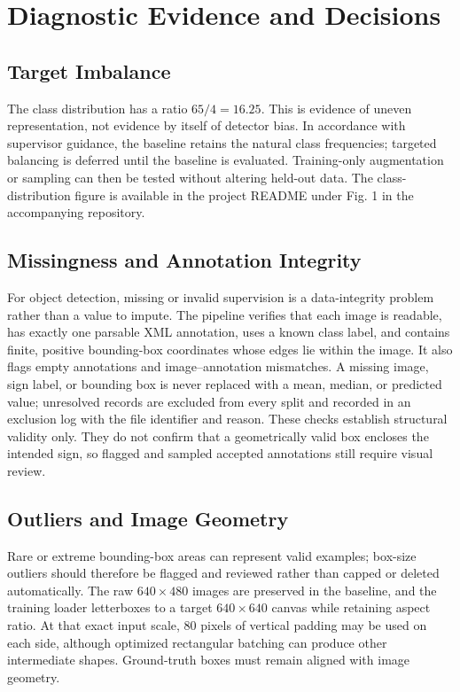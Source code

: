 \documentclass[conference]{IEEEtran}
\begin{document}
\section{Diagnostic Evidence and Decisions}
\subsection{Target Imbalance}
The class distribution has a ratio $65/4=16.25$. This is evidence of uneven representation, not evidence by itself of detector bias. In accordance with supervisor guidance, the baseline retains the natural class frequencies; targeted balancing is deferred until the baseline is evaluated. Training-only augmentation or sampling can then be tested without altering held-out data. The class-distribution figure is available in the project README under Fig. 1 in the accompanying repository.
\subsection{Missingness and Annotation Integrity}
For object detection, missing or invalid supervision is a data-integrity problem rather than a value to impute. The pipeline verifies that each image is readable, has exactly one parsable XML annotation, uses a known class label, and contains finite, positive bounding-box coordinates whose edges lie within the image. It also flags empty annotations and image--annotation mismatches. A missing image, sign label, or bounding box is never replaced with a mean, median, or predicted value; unresolved records are excluded from every split and recorded in an exclusion log with the file identifier and reason. These checks establish structural validity only. They do not confirm that a geometrically valid box encloses the intended sign, so flagged and sampled accepted annotations still require visual review.
\subsection{Outliers and Image Geometry}
Rare or extreme bounding-box areas can represent valid examples; box-size outliers should therefore be flagged and reviewed rather than capped or deleted automatically. The raw $640\times480$ images are preserved in the baseline, and the training loader letterboxes to a target $640\times640$ canvas while retaining aspect ratio. At that exact input scale, 80 pixels of vertical padding may be used on each side, although optimized rectangular batching can produce other intermediate shapes. Ground-truth boxes must remain aligned with image geometry.
\end{document}
